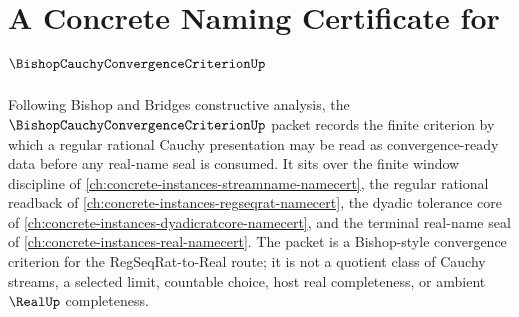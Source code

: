 \chapter{A Concrete Naming Certificate for $\BishopCauchyConvergenceCriterionUp$}
\label{ch:concrete-instances-bishop-cauchy-convergence-criterion-namecert}

Following Bishop and Bridges constructive analysis, the $\BishopCauchyConvergenceCriterionUp$ packet records the finite criterion by which a regular rational Cauchy presentation may be read as convergence-ready data before any real-name seal is consumed. It sits over the finite window discipline of \autoref{ch:concrete-instances-streamname-namecert}, the regular rational readback of \autoref{ch:concrete-instances-regseqrat-namecert}, the dyadic tolerance core of \autoref{ch:concrete-instances-dyadicratcore-namecert}, and the terminal real-name seal of \autoref{ch:concrete-instances-real-namecert}. The packet is a Bishop-style convergence criterion for the RegSeqRat-to-Real route; it is not a quotient class of Cauchy streams, a selected limit, countable choice, host real completeness, or ambient $\RealUp$ completeness.

